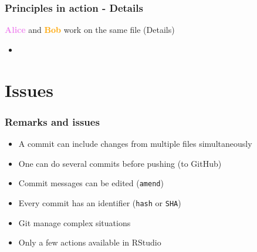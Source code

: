 \documentclass[xcolor=x11names,compress]{beamer}
\renewcommand{\(}{\begin{columns}}
\renewcommand{\)}{\end{columns}}
\newcommand{\<}[1]{\begin{column}{#1}}
\renewcommand{\>}{\end{column}}
\begin{document}
\begin{frame}
\frametitle{Principles in action - Details}
\textcolor{violet}{\textbf{Alice}} and \textcolor{orange}{\textbf{Bob}} work on the same file (Details)
\pause
\begin{itemize}
\item[]
\end{itemize}
\end{frame}

\section{Issues}

\begin{frame}
\frametitle{Remarks and issues}
    \begin{itemize}[<+->]
     \item A commit can include changes from multiple files simultaneously
     \item One can do several commits before pushing (to GitHub)
     \item Commit messages can be edited (\texttt{amend})
     \item Every commit has an identifier (\texttt{hash} or \texttt{SHA}) 
     \item Git manage complex situations
     \item Only a few actions available in RStudio
    \end{itemize}
\end{frame}
\end{document}
